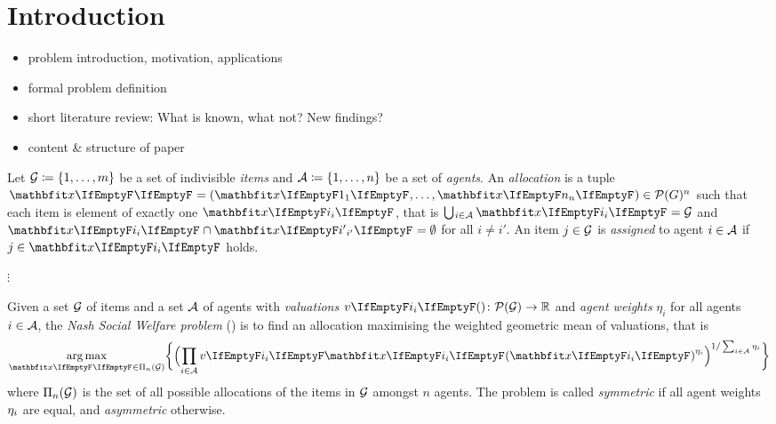 \section{Introduction}
\label{sec:intro}

\begin{itemize}
	\item
	problem introduction, motivation, applications

	\item
	formal problem definition

	\item
	short literature review: What is known, what not? New findings?

	\item
	content \& structure of paper
\end{itemize}

\begin{definition}
	Let \(\mathcal{G} \coloneq \{1, \dots, m\}\) be a set of indivisible \emph{items} and \(\mathcal{A} \coloneq \{1, \dots, n\}\) be a set of \emph{agents}.
	An \emph{allocation} is a tuple \(\alloc[][] = ( \alloc[][1], \dots, \alloc[][n] ) \in \powerset[G]^n\) such that each item is element of exactly one \(\alloc\), that is \(\mathop{\bigcup\hspace{-1pt}_{i \in \agents}} \alloc = \goods\) and \(\alloc \cap \alloc[][i'] = \emptyset\) for all \(i \neq i'\).
	An item \(j \in \mathcal{G}\) is \emph{assigned} to agent \(i \in \mathcal{A}\) if \(j \in \alloc\) holds.
\end{definition}

\(\vdots\)

\begin{definition}
	Given a set \(\mathcal{G}\) of items and a set \(\mathcal{A}\) of agents with \emph{valuations} \(\valuations \colon \powerset[\goods] \to \real\) and \emph{agent weights} \(\eta_i\) for all agents \(i \in \mathcal{A}\), the \emph{Nash Social Welfare problem} (\NSW) is to find an allocation maximising the weighted geometric mean of valuations, that is
	\begin{equation*}
		\argmax_{\alloc[][] \in \allallocs{n}{\goods}} \braces[\bigg]{ \paren[\Big]{ \prod_{i \in \agents} \valuations[\alloc]^{\weight{i}} }^{1 / \sum_{i \in \agents} \weight{i}} }
	\end{equation*}
	where \(\Pi_{n}(\mathcal{G})\) is the set of all possible allocations of the items in \(\mathcal{G}\) amongst \(n\) agents.
	The problem is called \emph{symmetric} if all agent weights \(\eta_{i}\) are equal, and \emph{asymmetric} otherwise.
\end{definition}

